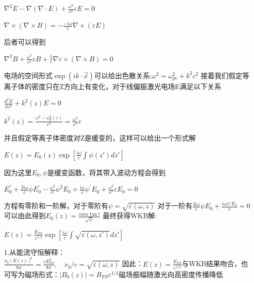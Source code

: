 \documentclass[12pt]{article}
\begin{document}
\begin{center}
    $\displaystyle \nabla^{2}E-\nabla(\nabla\cdot E)+{\frac{\omega^{2}}{c^{2}}}\varepsilon E=0$
\end{center}
\begin{center}
    $\displaystyle \nabla\times(\nabla\times B)=-{\frac{-i\omega}{c}}\nabla\times(\varepsilon E)$
\end{center}
后者可以得到
\begin{center}
    $\displaystyle \nabla^2 B + \frac{\omega^2}{c^2}\varepsilon B + \frac{1}{\varepsilon}\nabla \varepsilon \times(\nabla \times B) = 0$
\end{center}
电场的空间形式$\displaystyle \exp(ik\cdot \vec{x})$可以给出色散关系:$\displaystyle \omega^2 = \omega_{pe}^2+k^2c^2$
接着我们假定等离子体的密度只在Z方向上有变化，对于线偏振激光电场E满足以下关系
\begin{center}
    $\displaystyle\frac{d^{2}E}{d z^{2}}+k^{2}(z)E=0$
\end{center}
\begin{center}
    $\displaystyle k^{2}(z)=\frac{\omega^{2}-\omega_{p}^{2}(z)}{c^{2}}=\frac{\omega^{2}}{c^{2}}\varepsilon$
\end{center}
并且假定等离子体密度对Z是缓变的，这样可以给出一个形式解
\begin{center}
    $\displaystyle E(z)=E_0(z)\exp[\frac{i\omega}{c}\int\psi(z')dz']$
\end{center}
因为这里$E_0, \psi$是缓变函数，将其带入波动方程会得到
\begin{center}
    $\displaystyle E_{0}^{''}+\frac{2i\omega}{c}\psi E_{0}^{'}-\frac{\omega^{2}}{c^{2}}\psi^{2}E_{0}+\frac{i\omega}{c}\psi^{'}E_{0}+\frac{\omega^{2}}{c^{2}}\varepsilon E_{0}=0$
\end{center}
方程有零阶和一阶解，对于零阶有$\displaystyle \psi = \sqrt{\varepsilon(\omega, z)}$
对于一阶有$\displaystyle \frac{2i\omega}{c}\psi E_0+\frac{i\omega\psi'E_0}{c}=0$可以由此得到$\displaystyle E_0(z)=\frac{cons\tan t}{\sqrt{\psi}}$
最终获得WKB解:
\begin{center}
    $\displaystyle E(z)=\frac{E_{F S}}{\varepsilon^{1/4}}\exp[\frac{i\omega}{c}\int\sqrt{\varepsilon(\omega,z')}d z']$
\end{center}
1.从能流守恒解释：
\\
$\displaystyle \frac{\nu_{g}\mid E(z)\mid^{2}}{8\pi}=\frac{c E_{F S}^{2}}{8\pi},\quad\nu_{g}/c=\sqrt{\varepsilon(\omega,z)}$
因此：$\displaystyle E(z) = \frac{E_{FS}}{\varepsilon^{1/4}}$与WKB结果吻合，也可写为磁场形式：$\displaystyle |B_0(z)| = B_{FS}\varepsilon^{1/4}$磁场振幅随激光向高密度传播降低
\end{document}
